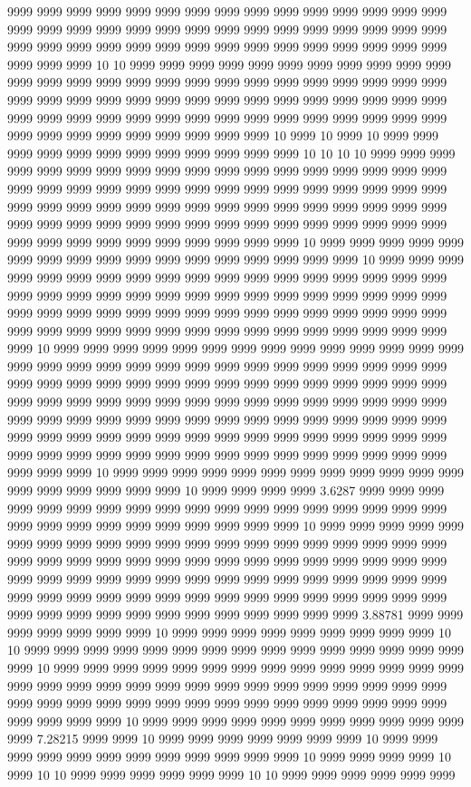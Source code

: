 9999 9999 9999 9999 9999 9999 9999 9999 9999 9999 9999 9999 9999 9999 9999 9999 9999 9999 9999 9999 9999 9999 9999 9999 9999 9999 9999 9999 9999 9999 9999 9999 9999 9999 9999 9999 9999 9999 9999 9999 9999 9999 9999 9999 9999 9999 9999 9999 10 10 9999 9999 9999 9999 9999 9999 9999 9999 9999 9999 9999 9999 9999 9999 9999 9999 9999 9999 9999 9999 9999 9999 9999 9999 9999 9999 9999 9999 9999 9999 9999 9999 9999 9999 9999 9999 9999 9999 9999 9999 9999 9999 9999 9999 9999 9999 9999 9999 9999 9999 9999 9999 9999 9999 9999 9999 9999 9999 9999 9999 9999 9999 9999 9999 9999 10 9999 10 9999 10 9999 9999 9999 9999 9999 9999 9999 9999 9999 9999 9999 9999 10 10 10 10 9999 9999 9999 9999 9999 9999 9999 9999 9999 9999 9999 9999 9999 9999 9999 9999 9999 9999 9999 9999 9999 9999 9999 9999 9999 9999 9999 9999 9999 9999 9999 9999 9999 9999 9999 9999 9999 9999 9999 9999 9999 9999 9999 9999 9999 9999 9999 9999 9999 9999 9999 9999 9999 9999 9999 9999 9999 9999 9999 9999 9999 9999 9999 9999 9999 9999 9999 9999 9999 9999 9999 9999 9999 10 9999 9999 9999 9999 9999 9999 9999 9999 9999 9999 9999 9999 9999 9999 9999 9999 9999 10 9999 9999 9999 9999 9999 9999 9999 9999 9999 9999 9999 9999 9999 9999 9999 9999 9999 9999 9999 9999 9999 9999 9999 9999 9999 9999 9999 9999 9999 9999 9999 9999 9999 9999 9999 9999 9999 9999 9999 9999 9999 9999 9999 9999 9999 9999 9999 9999 9999 9999 9999 9999 9999 9999 9999 9999 9999 9999 9999 9999 9999 9999 9999 9999 10 9999 9999 9999 9999 9999 9999 9999 9999 9999 9999 9999 9999 9999 9999 9999 9999 9999 9999 9999 9999 9999 9999 9999 9999 9999 9999 9999 9999 9999 9999 9999 9999 9999 9999 9999 9999 9999 9999 9999 9999 9999 9999 9999 9999 9999 9999 9999 9999 9999 9999 9999 9999 9999 9999 9999 9999 9999 9999 9999 9999 9999 9999 9999 9999 9999 9999 9999 9999 9999 9999 9999 9999 9999 9999 9999 9999 9999 9999 9999 9999 9999 9999 9999 9999 9999 9999 9999 9999 9999 9999 9999 9999 9999 9999 9999 9999 9999 9999 9999 9999 9999 9999 9999 9999 9999 9999 9999 10 9999 9999 9999 9999 9999 9999 9999 9999 9999 9999 9999 9999 9999 9999 9999 9999 9999 9999 10 9999 9999 9999 9999 3.6287 9999 9999 9999 9999 9999 9999 9999 9999 9999 9999 9999 9999 9999 9999 9999 9999 9999 9999 9999 9999 9999 9999 9999 9999 9999 9999 9999 9999 10 9999 9999 9999 9999 9999 9999 9999 9999 9999 9999 9999 9999 9999 9999 9999 9999 9999 9999 9999 9999 9999 9999 9999 9999 9999 9999 9999 9999 9999 9999 9999 9999 9999 9999 9999 9999 9999 9999 9999 9999 9999 9999 9999 9999 9999 9999 9999 9999 9999 9999 9999 9999 9999 9999 9999 9999 9999 9999 9999 9999 9999 9999 9999 9999 9999 9999 9999 9999 9999 9999 9999 9999 9999 9999 9999 9999 9999 3.88781 9999 9999 9999 9999 9999 9999 9999 10 9999 9999 9999 9999 9999 9999 9999 9999 9999 10 10 9999 9999 9999 9999 9999 9999 9999 9999 9999 9999 9999 9999 9999 9999 9999 9999 10 9999 9999 9999 9999 9999 9999 9999 9999 9999 9999 9999 9999 9999 9999 9999 9999 9999 9999 9999 9999 9999 9999 9999 9999 9999 9999 9999 9999 9999 9999 9999 9999 9999 9999 9999 9999 9999 9999 9999 9999 9999 9999 9999 9999 9999 9999 9999 9999 10 9999 9999 9999 9999 9999 9999 9999 9999 9999 9999 9999 9999 7.28215 9999 9999 10 9999 9999 9999 9999 9999 9999 9999 10 9999 9999 9999 9999 9999 9999 9999 9999 9999 9999 9999 9999 10 9999 9999 9999 9999 10 9999 10 10 9999 9999 9999 9999 9999 9999 10 10 9999 9999 9999 9999 9999 9999 